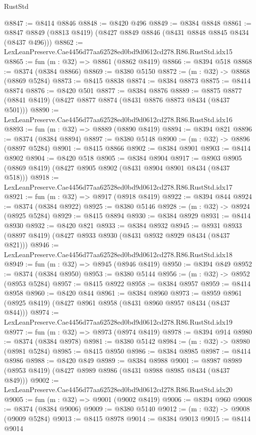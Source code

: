 \begin{lexlean}{RustStd}
\begin{coremodule}
@8847 := @8414 @8846
@8848 := @8420 @496
@8849 := @8384 @8848
@8861 := @8847 @8849 (@8813 @8419) (@8427 @8849 @8846 (@8431 @8848 @8845 @8434 (@8437 @496)))
@8862 := LexLeanPreserve.Cae4456d77aa62528ed0bd9d0612cd278.R86.RustStd.idx15
@8865 := fun (m : @32) => @8861 (@8862 @8419)
@8866 := @8394 @518
@8868 := @8374 (@8384 @8866)
@8869 := @8380 @5150
@8872 := (m : @32) -> @8868 (@8869 @5284)
@8873 := @8415 @8838
@8874 := @8384 @8873
@8875 := @8414 @8874
@8876 := @8420 @501
@8877 := @8384 @8876
@8889 := @8875 @8877 (@8841 @8419) (@8427 @8877 @8874 (@8431 @8876 @8873 @8434 (@8437 @501)))
@8890 := LexLeanPreserve.Cae4456d77aa62528ed0bd9d0612cd278.R86.RustStd.idx16
@8893 := fun (m : @32) => @8889 (@8890 @8419)
@8894 := @8394 @821
@8896 := @8374 (@8384 @8894)
@8897 := @8380 @5148
@8900 := (m : @32) -> @8896 (@8897 @5284)
@8901 := @8415 @8866
@8902 := @8384 @8901
@8903 := @8414 @8902
@8904 := @8420 @518
@8905 := @8384 @8904
@8917 := @8903 @8905 (@8869 @8419) (@8427 @8905 @8902 (@8431 @8904 @8901 @8434 (@8437 @518)))
@8918 := LexLeanPreserve.Cae4456d77aa62528ed0bd9d0612cd278.R86.RustStd.idx17
@8921 := fun (m : @32) => @8917 (@8918 @8419)
@8922 := @8394 @844
@8924 := @8374 (@8384 @8922)
@8925 := @8380 @5146
@8928 := (m : @32) -> @8924 (@8925 @5284)
@8929 := @8415 @8894
@8930 := @8384 @8929
@8931 := @8414 @8930
@8932 := @8420 @821
@8933 := @8384 @8932
@8945 := @8931 @8933 (@8897 @8419) (@8427 @8933 @8930 (@8431 @8932 @8929 @8434 (@8437 @821)))
@8946 := LexLeanPreserve.Cae4456d77aa62528ed0bd9d0612cd278.R86.RustStd.idx18
@8949 := fun (m : @32) => @8945 (@8946 @8419)
@8950 := @8394 @849
@8952 := @8374 (@8384 @8950)
@8953 := @8380 @5144
@8956 := (m : @32) -> @8952 (@8953 @5284)
@8957 := @8415 @8922
@8958 := @8384 @8957
@8959 := @8414 @8958
@8960 := @8420 @844
@8961 := @8384 @8960
@8973 := @8959 @8961 (@8925 @8419) (@8427 @8961 @8958 (@8431 @8960 @8957 @8434 (@8437 @844)))
@8974 := LexLeanPreserve.Cae4456d77aa62528ed0bd9d0612cd278.R86.RustStd.idx19
@8977 := fun (m : @32) => @8973 (@8974 @8419)
@8978 := @8394 @914
@8980 := @8374 (@8384 @8978)
@8981 := @8380 @5142
@8984 := (m : @32) -> @8980 (@8981 @5284)
@8985 := @8415 @8950
@8986 := @8384 @8985
@8987 := @8414 @8986
@8988 := @8420 @849
@8989 := @8384 @8988
@9001 := @8987 @8989 (@8953 @8419) (@8427 @8989 @8986 (@8431 @8988 @8985 @8434 (@8437 @849)))
@9002 := LexLeanPreserve.Cae4456d77aa62528ed0bd9d0612cd278.R86.RustStd.idx20
@9005 := fun (m : @32) => @9001 (@9002 @8419)
@9006 := @8394 @960
@9008 := @8374 (@8384 @9006)
@9009 := @8380 @5140
@9012 := (m : @32) -> @9008 (@9009 @5284)
@9013 := @8415 @8978
@9014 := @8384 @9013
@9015 := @8414 @9014

\end{coremodule}
\end{lexlean}
